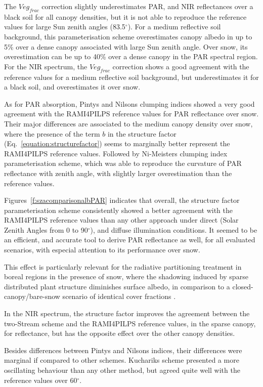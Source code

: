 \documentclass[a4paper,11pt]{report}
\begin{document}
The $Veg_{frac}$ correction slightly underestimates PAR, and NIR reflectances over a black soil for all canopy densities, but it is not able to reproduce the reference values for large Sun zenith angles (83.5$^{\circ}$). For a medium reflective soil background, this parameterisation scheme overestimates canopy albedo in up to 5\% over a dense canopy associated with large Sun zenith angle. Over snow, its overestimation can be up to 40\% over a dense canopy in the PAR spectral region.
For the NIR spectrum, the $Veg_{frac}$ correction shows a good agreement with the reference values for a medium reflective soil background, but underestimates it for a black soil, and overestimates it over snow.

As for PAR absorption, Pinty\textquotesingle s and Nilson\textquotesingle s clumping indices showed a very good agreement with the RAMI4PILPS reference values for PAR reflectance over snow. Their major differences are associated to the medium canopy density over snow, where the presence of the term $b$ in the structure factor (Eq.~\ref{equation:structurefactor}) seems to marginally better represent the RAMI4PILPS reference values. Followed by Ni-Meister\textquotesingle s clumping index parameterisation scheme, which was able to reproduce the curvature of PAR reflectance with zenith angle, with slightly larger overestimation than the reference values.

Figures~\ref{f:szacomparisonalbPAR} indicates that overall, the structure factor parameterisation scheme consistently showed a better agreement with the RAMI4PILPS reference values than any other approach under direct (Solar Zenith Angles from 0 to 90$^{\circ}$), and diffuse illumination conditions. It seemed to be an efficient, and accurate tool to derive PAR reflectance as well, for all evaluated scenarios, with especial attention to its performance over snow.

This effect is particularly relevant for the radiative partitioning treatment in boreal regions in the presence of snow, where the shadowing induced by sparse distributed plant structure diminishes surface albedo, in comparison to a closed-canopy/bare-snow scenario of identical cover fractions \citep{Viterbo1999}. 

In the NIR spectrum, the structure factor improves the agreement between the two-Stream scheme and the RAMI4PILPS reference values, in the sparse canopy, for reflectance, but has the opposite effect over the other canopy densities.

Besides differences between Pinty\textquotesingle s and Nilson\textquotesingle s indices, their differences were marginal if compared to other schemes. Kucharik\textquotesingle s scheme presented a more oscillating behaviour than any other method, but agreed quite well with the reference values over 60$^{\circ}$. 
\end{document}
